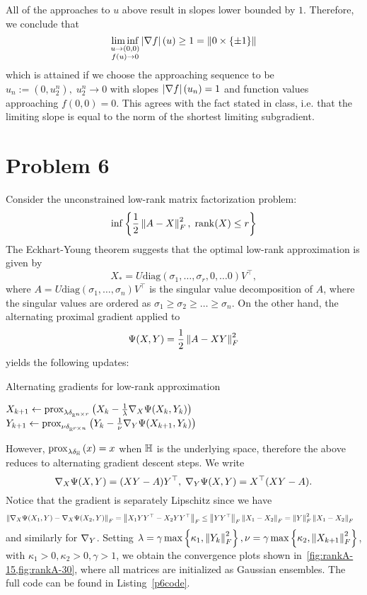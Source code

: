 \documentclass[10pt]{article}
\begin{document}
All of the approaches to $u$ above result in slopes lower bounded by $1$.
Therefore, we conclude that
\[
    \liminf_{\substack{u \to (0, 0) \\ f(u) \to 0}} \left| \nabla f \right|(u) \geq 1
    = \left \| 0 \times \left\{ \pm 1 \right\} \right \|
\]
which is attained if we choose the approaching sequence to be $u_n := (0,
u_2^n), \; u_2^n \to 0$ with slopes $\left| \nabla f \right|(u_n) = 1$ and function
values approaching $f(0, 0) = 0$. This agrees with
the fact stated in class, i.e. that the limiting slope is equal to the norm of
the shortest limiting subgradient.

\section*{Problem 6}
Consider the unconstrained low-rank matrix factorization problem:
\[
    \inf\left\{ \frac{1}{2}\left \| A - X \right \|_F^2, \; \mathrm{rank}(X) \leq r \right\}
\]
The Eckhart-Young theorem suggests that the optimal low-rank approximation is
given by
\[
    X_* = U \mathrm{diag}(\sigma_1, \dots, \sigma_r, 0, \dots 0) V^\top,
\]
where $A = U \mathrm{diag}(\sigma_1, \dots, \sigma_n) V^\top$ is the singular
value
decomposition of $A$, where the singular values are ordered as $\sigma_1 \geq
\sigma_2 \geq \dots \geq \sigma_n$.
On the other hand, the alternating proximal gradient applied to
\[
    \Psi(X, Y) = \frac{1}{2} \left \| A - XY \right \|_F^2
\]
yields the following updates:
\begin{algorithm}
    \caption{Alternating gradients for low-rank approximation}
    \begin{algorithmic}
        \Repeat
            \State $X_{k+1} \gets \mathrm{prox}_{\lambda \delta_{\mathbb{R}^{n \times r}}}\left( 
                X_k - \frac{1}{\lambda} \nabla_X \Psi(X_k, Y_k) \right)$
            \State $Y_{k+1} \gets \mathrm{prox}_{\nu \delta_{\mathbb{R}^{r \times n}}}\left( 
                Y_k - \frac{1}{\nu} \nabla_Y \Psi(X_{k+1}, Y_k) \right)$
    \end{algorithmic}
\end{algorithm}
However, $\mathrm{prox}_{\lambda \delta_{\mathbb{H}}}\left( x \right) = x$ when $\mathbb{H}$ is the underlying
space, therefore the above reduces to alternating gradient descent steps.
We write
\[
    \nabla_X \Psi(X, Y) = (XY - A) Y^\top, \; \nabla_Y \Psi(X, Y) = X^\top (XY -
    A).
\]
Notice that the gradient is separately Lipschitz since we have
\begin{align*}
    \left \| \nabla_{X} \Psi(X_1, Y) - \nabla_X \Psi(X_2, Y) \right \|_F &=
        \left \| X_1 Y Y^\top - X_2 Y Y^\top \right \|_F \leq \left \| YY^\top \right \|_F
        \left \| X_1 - X_2 \right \|_F = \left \| Y \right \|_F^2 \left \| X_1 - X_2 \right \|_F
\end{align*}
and similarly for $\nabla_Y$. Setting $\lambda = \gamma \max\left\{ \kappa_1,
\left \| Y_k \right \|_F^2 \right\}, \nu = \gamma \max\left\{ \kappa_2,
\left \| X_{k+1} \right \|_F^2 \right\}$, with $\kappa_1 > 0, \kappa_2 > 0, \gamma > 1$, we
obtain the convergence plots shown in~\cref{fig:rankA-15,fig:rankA-30}, where
all matrices are initialized as Gaussian ensembles. The full code can be found
in Listing~\ref{p6code}.
\end{document}
